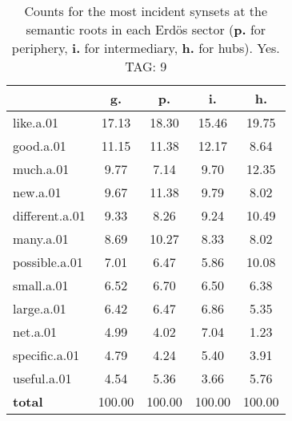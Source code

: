 \begin{table}[h!]
\begin{center}
\begin{tabular}{| l | c | c | c | c |}\hline
 & g. & p. & i. & h. \\\hline
like.a.01 & 17.13  & 18.30  & 15.46  & 19.75 \\\hline
good.a.01 & 11.15  & 11.38  & 12.17  & 8.64 \\\hline
much.a.01 & 9.77  & 7.14  & 9.70  & 12.35 \\\hline
new.a.01 & 9.67  & 11.38  & 9.79  & 8.02 \\\hline
different.a.01 & 9.33  & 8.26  & 9.24  & 10.49 \\\hline
many.a.01 & 8.69  & 10.27  & 8.33  & 8.02 \\\hline
possible.a.01 & 7.01  & 6.47  & 5.86  & 10.08 \\\hline
small.a.01 & 6.52  & 6.70  & 6.50  & 6.38 \\\hline
large.a.01 & 6.42  & 6.47  & 6.86  & 5.35 \\\hline
net.a.01 & 4.99  & 4.02  & 7.04  & 1.23 \\\hline
specific.a.01 & 4.79  & 4.24  & 5.40  & 3.91 \\\hline
useful.a.01 & 4.54  & 5.36  & 3.66  & 5.76 \\\hline
{{\bf total}} & 100.00  & 100.00  & 100.00  & 100.00 \\\hline
\end{tabular}
\caption{Counts for the most incident synsets at the semantic roots in each Erd\"os sector ({\bf p.} for periphery, {\bf i.} for intermediary, {\bf h.} for hubs). Yes. TAG: 9}
\end{center}
\end{table}